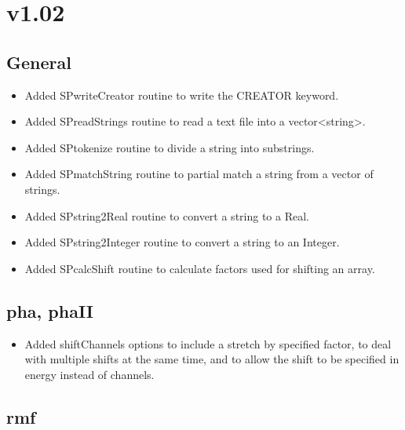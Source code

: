 \documentclass[11pt]{book}
\begin{document}
\section{v1.02}

\subsection{General}

\begin{itemize}

\item Added SPwriteCreator routine to write the CREATOR keyword.

\item Added SPreadStrings routine to read a text file into a
  vector<string>.

\item Added SPtokenize routine to divide a string into substrings.

\item Added SPmatchString routine to partial match a string from a
  vector of strings.

\item Added SPstring2Real routine to convert a string to a Real.

\item Added SPstring2Integer routine to convert a string to an Integer.

\item Added SPcalcShift routine to calculate factors used for shifting
  an array.

\end{itemize}

\subsection{pha, phaII}

\begin{itemize}

\item Added shiftChannels options to include a stretch by specified
  factor, to deal with multiple shifts at the same time, and to allow
  the shift to be specified in energy instead of channels.

\end{itemize}

\subsection{rmf}
\end{document}
